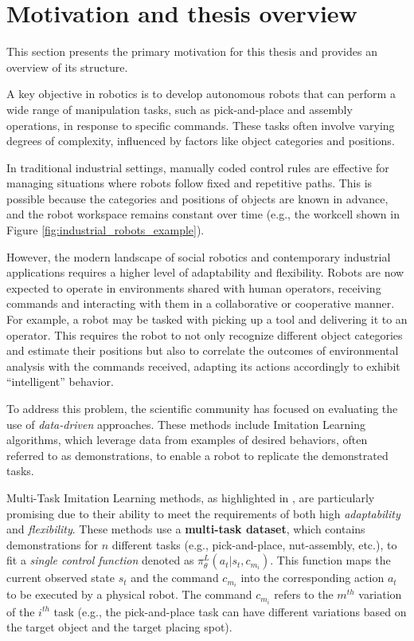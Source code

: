 \section{Motivation and thesis overview}

This section presents the primary motivation for this thesis and provides an overview of its structure.

A key objective in robotics is to develop autonomous robots that can perform a wide range of manipulation tasks, such as pick-and-place and assembly operations, in response to specific commands. These tasks often involve varying degrees of complexity, influenced by factors like object categories and positions.

In traditional industrial settings, manually coded control rules are effective for managing situations where robots follow fixed and repetitive paths. This is possible because the categories and positions of objects are known in advance, and the robot workspace remains constant over time (e.g., the workcell shown in Figure \ref{fig:industrial_robots_example}).

However, the modern landscape of social robotics and contemporary industrial applications requires a higher level of adaptability and flexibility. Robots are now expected to operate in environments shared with human operators, receiving commands and interacting with them in a collaborative or cooperative manner. For example, a robot may be tasked with picking up a tool and delivering it to an operator. This requires the robot to not only recognize different object categories and estimate their positions but also to correlate the outcomes of environmental analysis with the commands received, adapting its actions accordingly to exhibit ``intelligent'' behavior.



To address this problem, the scientific community has focused on evaluating the use of \textit{data-driven} approaches. These methods include Imitation Learning algorithms, which leverage data from examples of desired behaviors, often referred to as demonstrations, to enable a robot to replicate the demonstrated tasks.

Multi-Task Imitation Learning methods, as highlighted in \cite{jang2022bc_z, dasari2021transformers_one_shot, mandi2022towards_more_generalizable_one_shot, brohan2022rt}, are particularly promising due to their ability to meet the requirements of both high \textit{adaptability} and \textit{flexibility}. These methods use a \textbf{multi-task dataset}, which contains demonstrations for $n$ different tasks (e.g., pick-and-place, nut-assembly, etc.), to fit a \textit{single control function} denoted as $\pi^{L}_{\theta}(a_{t}|s_{t}, c_{m_{i}})$. This function maps the current observed state $s_{t}$ and the command $c_{m_{i}}$ into the corresponding action $a_{t}$ to be executed by a physical robot. The command $c_{m_{i}}$ refers to the $m^{th}$ variation of the $i^{th}$ task (e.g., the pick-and-place task can have different variations based on the target object and the target placing spot).

